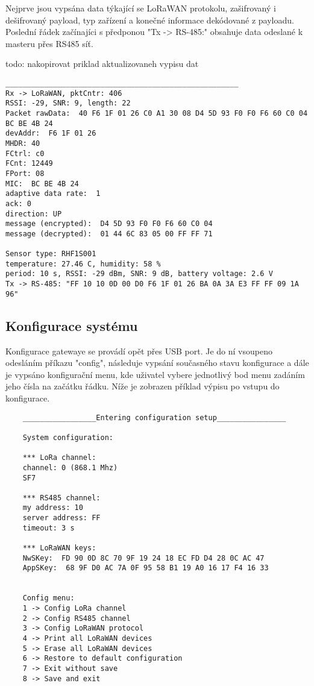 Nejprve jsou vypsána data týkající se LoRaWAN protokolu, zašifrovaný i dešifrovaný payload, typ zařízení a konečné informace dekódované z payloadu.
Poslední řádek začínajíci s předponou "Tx -> RS-485:" obsahuje data odeslané k masteru přes RS485 síť.

todo: nakopirovat priklad aktualizovaneh vypisu dat
\begin{lstlisting}
______________________________________________________
Rx -> LoRaWAN, pktCntr: 406
RSSI: -29, SNR: 9, length: 22
Packet rawData:  40 F6 1F 01 26 C0 A1 30 08 D4 5D 93 F0 F0 F6 60 C0 04 BC BE 4B 24
devAddr:  F6 1F 01 26
MHDR: 40
FCtrl: c0
FCnt: 12449
FPort: 08
MIC:  BC BE 4B 24
adaptive data rate:  1
ack: 0
direction: UP
message (encrypted):  D4 5D 93 F0 F0 F6 60 C0 04
message (decrypted):  01 44 6C 83 05 00 FF FF 71

Sensor type: RHF1S001
temperature: 27.46 C, humidity: 58 %
period: 10 s, RSSI: -29 dBm, SNR: 9 dB, battery voltage: 2.6 V
Tx -> RS-485: "FF 10 10 0D 00 D0 F6 1F 01 26 BA 0A 3A E3 FF FF 09 1A 96"
\end{lstlisting}

\subsection{Konfigurace systému}
Konfigurace gatewaye se provádí opět přes USB port. Je do ní vsoupeno odesláním příkazu
"config", následuje vypsání současného stavu konfigurace a dále je vypsáno konfigurační menu, kde uživatel vybere jednotlivý bod menu zadáním jeho čísla na začátku řádku.
Níže je zobrazen příklad výpisu po vstupu do konfigurace.

\begin{lstlisting}
    _________________Entering configuration setup________________
    
    System configuration:
    
    *** LoRa channel: 
    channel: 0 (868.1 Mhz)
    SF7
    
    *** RS485 channel: 
    my address: 10
    server address: FF
    timeout: 3 s
    
    *** LoRaWAN keys: 
    NwSKey:  FD 90 0D 8C 70 9F 19 24 18 EC FD D4 28 0C AC 47
    AppSKey:  68 9F D0 AC 7A 0F 95 58 B1 19 A0 16 17 F4 16 33
    
    
    Config menu:
    1 -> Config LoRa channel
    2 -> Config RS485 channel
    3 -> Config LoRaWAN protocol
    4 -> Print all LoRaWAN devices
    5 -> Erase all LoRaWAN devices
    6 -> Restore to default configuration
    7 -> Exit without save
    8 -> Save and exit
\end{lstlisting}
    

